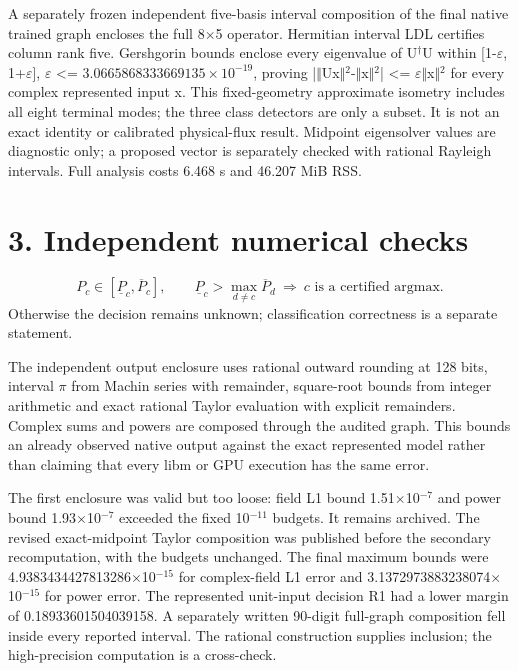 \documentclass[11pt]{article}
\begin{document}
A separately frozen independent five-basis interval composition of the final native trained graph encloses the full 8$\times$5 operator. Hermitian interval LDL certifies column rank five. Gershgorin bounds enclose every eigenvalue of U$^{\dagger}$U within [1-$\varepsilon$, 1+$\varepsilon$], $\varepsilon$ <= $3.0665868333669135\times10^{-19}$, proving |$\Vert$Ux$\Vert$$^{2}$-$\Vert$x$\Vert$$^{2}$| <= $\varepsilon$$\Vert$x$\Vert$$^{2}$ for every complex represented input x. This fixed-geometry approximate isometry includes all eight terminal modes; the three class detectors are only a subset. It is not an exact identity or calibrated physical-flux result. Midpoint eigensolver values are diagnostic only; a proposed vector is separately checked with rational Rayleigh intervals. Full analysis costs 6.468 s and 46.207 MiB RSS.

\section*{3. Independent numerical checks}
\[
 P_c\in[\underline P_c,\overline P_c],\qquad
 \underline P_c>\max_{d\ne c}\overline P_d\ \Longrightarrow\ c\text{ is a certified argmax.}
\]
Otherwise the decision remains unknown; classification correctness is a separate statement.


The independent output enclosure uses rational outward rounding at 128 bits, interval $\pi$ from Machin series with remainder, square-root bounds from integer arithmetic and exact rational Taylor evaluation with explicit remainders. Complex sums and powers are composed through the audited graph. This bounds an already observed native output against the exact represented model rather than claiming that every libm or GPU execution has the same error.

The first enclosure was valid but too loose: field L1 bound 1.51$\times$10$^{-7}$ and power bound 1.93$\times$10$^{-7}$ exceeded the fixed 10$^{-11}$ budgets. It remains archived. The revised exact-midpoint Taylor composition was published before the secondary recomputation, with the budgets unchanged. The final maximum bounds were 4.9383434427813286$\times$10$^{-15}$ for complex-field L1 error and 3.1372973883238074$\times$10$^{-15}$ for power error. The represented unit-input decision R1 had a lower margin of 0.18933601504039158. A separately written 90-digit full-graph composition fell inside every reported interval. The rational construction supplies inclusion; the high-precision computation is a cross-check.
\end{document}
